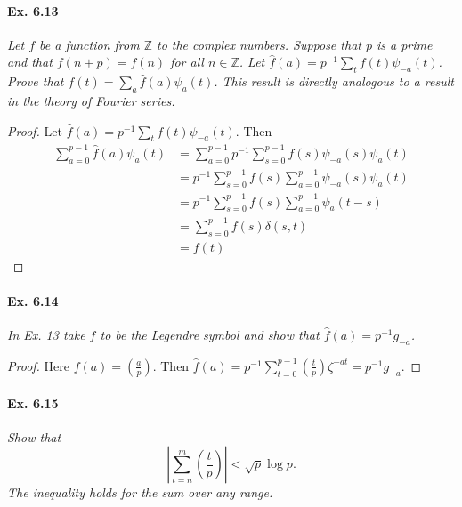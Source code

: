 \documentclass[11pt,a4paper]{article}
\newcommand{\Z}{\mathbb{Z}}
\newcommand{\legendre}[2]{\genfrac{(}{)}{}{}{#1}{#2}}
\begin{document}
\paragraph{Ex. 6.13}

{\it Let $f$ be a function from $\Z$ to the complex numbers. Suppose that $p$ is a prime and that $f(n+p) = f(n)$ for all $n \in \Z$. Let $\hat{f}(a) = p^{-1} \sum_t f(t) \psi_{-a}(t)$. Prove that $f(t) = \sum_a\hat{f}(a)\psi_a(t)$. This result is directly analogous to a result in the theory of Fourier series.
}

\begin{proof}
Let $\hat{f}(a) = p^{-1} \sum_t f(t) \psi_{-a}(t)$. Then
\begin{align*}
\sum_{a=0}^{p-1} \hat{f}(a) \psi_a(t) &= \sum_{a=0}^{p-1} p^{-1} \sum_{s=0}^{p-1} f(s) \psi_{-a}(s) \psi_{a}(t)\\
&=p^{-1} \sum_{s=0}^{p-1}f(s)  \sum_{a=0}^{p-1}  \psi_{-a}(s) \psi_{a}(t)\\
&=p^{-1} \sum_{s=0}^{p-1}f(s)  \sum_{a=0}^{p-1}  \psi_{a}(t-s) \\
&= \sum_{s=0}^{p-1} f(s) \delta(s,t)\\
&=f(t)
\end{align*}
\end{proof}

\paragraph{Ex. 6.14}

{\it In Ex. 13 take $f$ to be the Legendre symbol and show that $\hat{f}(a) = p^{-1} g_{-a}$.
}

\begin{proof}
Here $f(a) = \legendre{a}{p}$. Then
$\hat{f}(a) = p^{-1} \sum_{t=0}^{p-1} \legendre{t}{p} \zeta^{-at} = p^{-1} g_{-a}$.
\end{proof}

\paragraph{Ex. 6.15}

{\it Show that
$$ \left|\sum_{t = n}^m \legendre{t}{p}\right| < \sqrt{p}\log p.$$
The inequality holds for the sum over any range.
}
\end{document}
